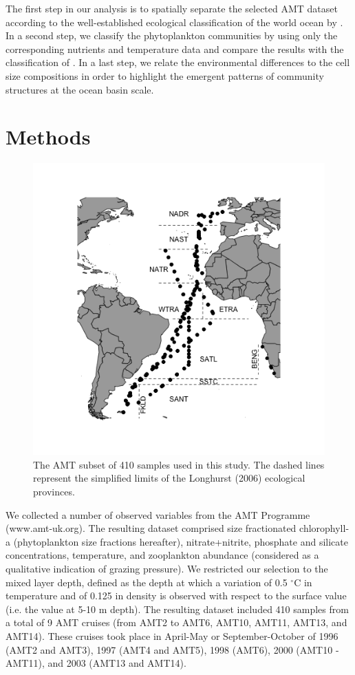 The first step in our analysis is to spatially separate the selected AMT dataset according to the well-established ecological classification of the world ocean by \citet{Longhurst2006}. In a second step, we classify the phytoplankton communities by using only the corresponding nutrients and temperature data and compare the results with the classification of \citet{Longhurst2006}. In a last step, we relate the environmental differences to the cell size compositions in order to highlight the emergent patterns of community structures at the ocean basin scale.

\section{Methods}

\begin{figure}
\centering
\includegraphics[trim = 30mm 20mm 25mm 20mm, clip, width=0.5\linewidth]{./Chp2-Pre/amt_mapFINAL2.png}
\caption[Scheme]{\small {The AMT subset of 410 samples used in this study. The dashed lines represent the simplified limits of the Longhurst (2006) ecological provinces.}}
\label{Map}
\end{figure}

We collected a number of observed variables from the AMT Programme (www.amt-uk.org). The resulting dataset comprised size fractionated chlorophyll-a (phytoplankton size fractions hereafter), nitrate+nitrite, phosphate and silicate concentrations, temperature, and zooplankton abundance (considered as a qualitative indication of grazing pressure). We restricted our selection to the mixed layer depth, defined as the depth at which a variation of 0.5 $^\circ$C in temperature and of 0.125 in density is observed with respect to the surface value (i.e. the value at 5-10 m depth). The resulting dataset included 410 samples from a total of 9 AMT cruises (from AMT2 to AMT6, AMT10, AMT11, AMT13, and AMT14). These cruises took place in April-May or September-October of 1996 (AMT2 and AMT3), 1997 (AMT4 and AMT5), 1998 (AMT6), 2000 (AMT10 -AMT11), and 2003 (AMT13 and AMT14). 

